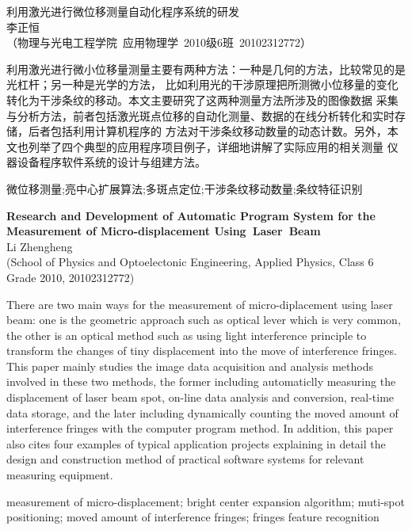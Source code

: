 \begin{center}
  {\heiti{}利用激光进行微位移测量自动化程序系统的研发}\\[2em]
  {李正恒}\\[0.5em]
  {（物理与光电工程学院\, 应用物理学\, 2010级6班\, 20102312772）}\\
\end{center}
\begin{MyAbstract}  %
利用激光进行微小位移量测量主要有两种方法：一种是几何的方法，比较常见的是光杠杆；另一种是光学的方法，
比如利用光的干涉原理把所测微小位移量的变化转化为干涉条纹的移动。本文主要研究了这两种测量方法所涉及的图像数据
采集与分析方法，前者包括激光斑点位移的自动化测量、数据的在线分析转化和实时存储，后者包括利用计算机程序的
方法对干涉条纹移动数量的动态计数。另外，本文也列举了四个典型的应用程序项目例子，详细地讲解了实际应用的相关测量
仪器设备程序软件系统的设计与组建方法。
 
\end{MyAbstract}
\begin{MyKeywords}  %
  微位移测量;\;亮中心扩展算法;\;多斑点定位;\;干涉条纹移动数量;\;条纹特征识别
\end{MyKeywords}
\vspace{3mm}
\begin{center}
  {\textbf{Research and Development of Automatic Program System for the Measurement of Micro-displacement \mbox{Using Laser Beam} } }\\[2em]  
  {Li Zhengheng }\\[0.5em]
  {(School of Physics and Optoelectonic Engineering, Applied Physics,
    Class 6 Grade 2010, 20102312772) }\\
\end{center}
\begin{MyAbstract}[en]  %
There are two main ways for the measurement of micro-diplacement using laser beam: one is the 
geometric approach such as optical lever which is very common, the other is an optical method 
such as using light interference principle to transform the changes of tiny displacement into the 
move of interference fringes. This paper mainly studies the image data acquisition and analysis 
methods involved in these two methods, the former including automaticlly measuring the displacement
of laser beam spot, on-line data analysis and conversion, real-time data storage, and the later 
including dynamically counting the moved amount of interference fringes with the computer program
method. In addition, this paper also cites four examples of typical application  projects 
explaining in detail the design and construction method of practical software systems for relevant 
measuring equipment.

\end{MyAbstract}
\begin{MyKeywords}[en]  %
measurement of micro-displacement; bright center expansion algorithm; muti-spot positioning; 
moved amount of interference fringes; fringes feature recognition
  
\end{MyKeywords}


